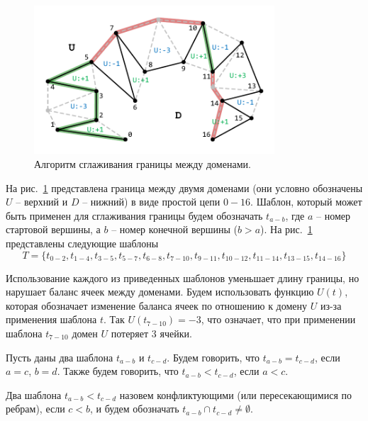 \begin{figure}[ht]
\centering
\includegraphics[width=0.8\textwidth]{./pics/text_2_smooth/smooth.pdf}
\singlespacing
{}\caption{Алгоритм сглаживания границы между доменами.}
\label{fig:text_2_smooth_smooth}
\end{figure}

На рис.~\ref{fig:text_2_smooth_smooth} представлена граница между двумя доменами (они условно обозначены $U$ -- верхний и $D$ -- нижний) в виде простой цепи $0-16$.
Шаблон, который может быть применен для сглаживания границы будем обозначать $t_{a-b}$, где $a$ -- номер стартовой вершины, а $b$ -- номер конечной вершины ($b > a$).
На рис.~\ref{fig:text_2_smooth_smooth} представлены следующие шаблоны
\begin{equation}
T = \{ t_{0-2}, t_{1-4}, t_{3-5}, t_{5-7}, t_{6-8}, t_{7-10}, t_{9-11}, t_{10-12}, t_{11-14}, t_{13-15}, t_{14-16} \}
\end{equation}

Использование каждого из приведенных шаблонов уменьшает длину границы, но нарушает баланс ячеек между доменами.
Будем использовать функцию $U(t)$, которая обозначает изменение баланса ячеек по отношению к домену $U$ из-за применения шаблона $t$.
Так $U(t_{7-10}) = -3$, что означает, что при применении шаблона $t_{7-10}$ домен $U$ потеряет 3 ячейки.

\begin{definition}
Пусть даны два шаблона $t_{a-b}$ и $t_{c-d}$.
Будем говорить, что $t_{a-b} = t_{c-d}$, если $a = c$, $b = d$.
Также будем говорить, что $t_{a-b} < t_{c-d}$, если $a < c$.
\end{definition}

\begin{definition}
Два шаблона $t_{a-b} < t_{c-d}$ назовем конфликтующими (или пересекающимися по ребрам), если $c < b$, и будем обозначать $t_{a-b} \cap t_{c-d} \ne \emptyset$.
\end{definition}

